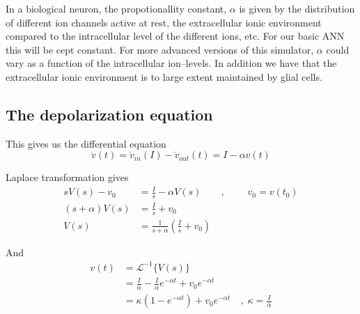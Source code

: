 In a biological neuron, the propotionallity constant, $\alpha$ is given by the distribution of different ion channels active at rest, the extracellular ionic environment compared to the intracellular level of the different ions, etc.
For our basic ANN this will be cept constant. For more advanced versions of this simulator, $\alpha$ could vary as a function of the intracellular ion--levels. 
In addition we have that the extracellular ionic environment is to large extent maintained by glial cells.


\subsection{The depolarization equation}%
This gives us the differential equation 
\begin{equation}
	\dot{v}(t) = \dot{v}_{in}(I) - \dot{v}_{out}(t) = I - \alpha v(t)
\end{equation}

Laplace transformation gives
\begin{equation}
	\begin{split}
		sV(s)-v_0 		&= \frac{I}{s} - \alpha V(s) 			\qquad, \; \qquad v_0 = v(t_0) 				\\
		(s+\alpha)V(s) 	&= \frac{I}{s} + v_0 														\\
		V(s) 			&= \frac{1}{s+\alpha}\left( \frac{I}{s} + v_0 \right)
	\end{split}
\end{equation}

And 
\begin{equation}
	\begin{split}
		v(t)  	&= 		\mathscr{L}^{-1}\bigg\{ V(s) \bigg\}  									\\
		 		&=		\frac{I}{\alpha} - \frac{I}{\alpha} e^{-\alpha t} + v_0 e^{-\alpha t} 	\\
				&= 		\kappa \left( 1 - e^{-\alpha t} \right) + v_0 e^{-\alpha t} 	\quad,\; \kappa = \frac{I}{\alpha} 
		\label{eqVerdiligninga}
	\end{split}
\end{equation}

